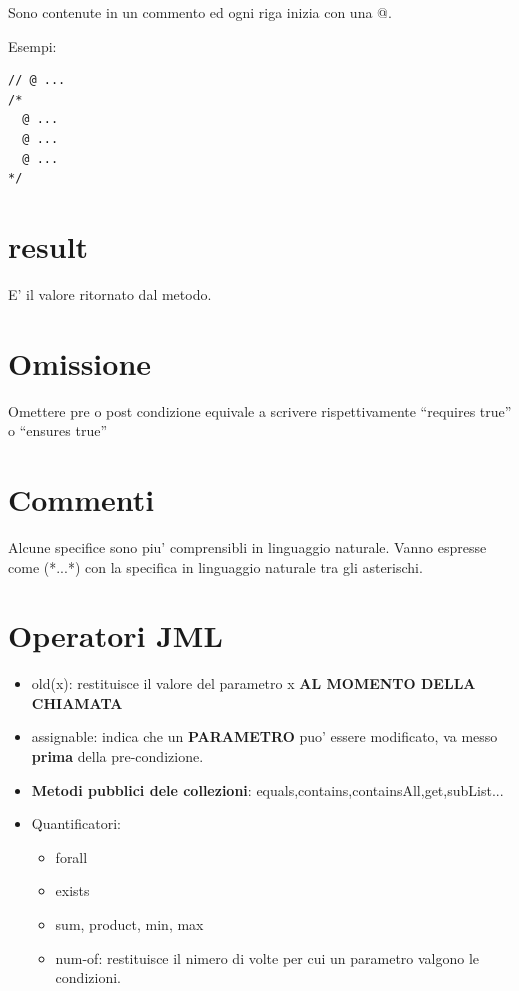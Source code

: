 \documentclass[\main/main.tex]{subfiles}
\begin{document}
Sono contenute in un commento ed ogni riga inizia con una @.

Esempi:
\begin{verbatim}
// @ ...
/*
  @ ...
  @ ...
  @ ...
*/
\end{verbatim}



\section{\bs result}
E' il valore ritornato dal metodo.




\section{Omissione}
Omettere pre o post condizione equivale a scrivere rispettivamente ``requires true'' o ``ensures true''


\section{Commenti}
Alcune specifice sono piu' comprensibli in linguaggio naturale.
Vanno espresse come (*...*) con la specifica in linguaggio naturale tra gli asterischi.



\section{Operatori JML}
\begin{itemize}
  \item \bs old(x): restituisce il valore del parametro x \textbf{AL MOMENTO DELLA CHIAMATA}
  \item assignable: indica che un \textbf{PARAMETRO} puo' essere modificato, va messo \textbf{prima} della pre-condizione.
  \item \textbf{Metodi pubblici dele collezioni}: equals,contains,containsAll,get,subList...
  \item Quantificatori:
  \begin{itemize}
    \item \bs forall
    \item \bs exists
    \item \bs sum, \bs product, \bs min, \bs max
    \item \bs num-of: restituisce il nimero di volte per cui un parametro valgono le condizioni.
  \end{itemize}
\end{itemize}
\end{document}
